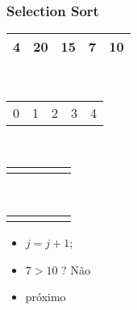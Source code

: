 \documentclass{beamer}
\begin{document}
\begin{frame}
    \frametitle{Selection Sort}
    \begin{center}
        \begin{table}
            \begin{tabular}{| p{0.25cm} | p{0.25cm} | p{0.25cm} | p{0.25cm} | p{0.25cm} |}
                \hline
                4 & 20 & 15 & 7 & 10 \\ \hline
            \end{tabular} \\
            \begin{tabular}{p{0.25cm} p{0.25cm} p{0.25cm} p{0.25cm} p{0.25cm}}
                0 & 1 & 2 & 3 & 4
            \end{tabular} \\
            \begin{tabular}{p{0.25cm} p{0.25cm} p{0.25cm} p{0.25cm} p{0.25cm}}
                 & \color{blue}{$\uparrow$} & & & \color{red}{$\uparrow$}
            \end{tabular} \\
            \begin{tabular}{p{0.25cm} p{0.25cm} p{0.25cm} p{0.25cm} p{0.25cm}}
                 & \color{blue}{i} & & & \color{red}{j}
            \end{tabular}
        \end{table}
	\end{center}
    \color{green}{$troca = 3$}
    \begin{itemize}[<+->]
        \item $j = j + 1$;
        \item $7 > 10$ ? Não
        \item próximo
    \end{itemize}
\end{frame}
\end{document}
